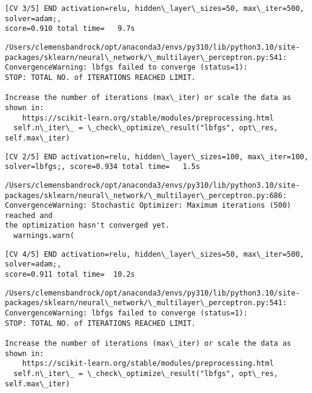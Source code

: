 \documentclass[11pt]{article}
\begin{document}
    \begin{Verbatim}[commandchars=\\\{\}]
[CV 3/5] END activation=relu, hidden\_layer\_sizes=50, max\_iter=500, solver=adam;,
score=0.910 total time=   9.7s
    \end{Verbatim}

    \begin{Verbatim}[commandchars=\\\{\}]
/Users/clemensbandrock/opt/anaconda3/envs/py310/lib/python3.10/site-
packages/sklearn/neural\_network/\_multilayer\_perceptron.py:541:
ConvergenceWarning: lbfgs failed to converge (status=1):
STOP: TOTAL NO. of ITERATIONS REACHED LIMIT.

Increase the number of iterations (max\_iter) or scale the data as shown in:
    https://scikit-learn.org/stable/modules/preprocessing.html
  self.n\_iter\_ = \_check\_optimize\_result("lbfgs", opt\_res, self.max\_iter)
    \end{Verbatim}

    \begin{Verbatim}[commandchars=\\\{\}]
[CV 2/5] END activation=relu, hidden\_layer\_sizes=100, max\_iter=100,
solver=lbfgs;, score=0.934 total time=   1.5s
    \end{Verbatim}

    \begin{Verbatim}[commandchars=\\\{\}]
/Users/clemensbandrock/opt/anaconda3/envs/py310/lib/python3.10/site-
packages/sklearn/neural\_network/\_multilayer\_perceptron.py:686:
ConvergenceWarning: Stochastic Optimizer: Maximum iterations (500) reached and
the optimization hasn't converged yet.
  warnings.warn(
    \end{Verbatim}

    \begin{Verbatim}[commandchars=\\\{\}]
[CV 4/5] END activation=relu, hidden\_layer\_sizes=50, max\_iter=500, solver=adam;,
score=0.911 total time=  10.2s
    \end{Verbatim}

    \begin{Verbatim}[commandchars=\\\{\}]
/Users/clemensbandrock/opt/anaconda3/envs/py310/lib/python3.10/site-
packages/sklearn/neural\_network/\_multilayer\_perceptron.py:541:
ConvergenceWarning: lbfgs failed to converge (status=1):
STOP: TOTAL NO. of ITERATIONS REACHED LIMIT.

Increase the number of iterations (max\_iter) or scale the data as shown in:
    https://scikit-learn.org/stable/modules/preprocessing.html
  self.n\_iter\_ = \_check\_optimize\_result("lbfgs", opt\_res, self.max\_iter)
    \end{Verbatim}
\end{document}
